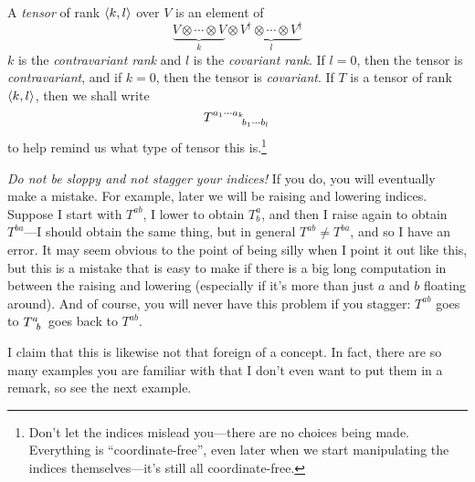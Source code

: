 \begin{dfn}[Tensor]\label{Tensor}
A \emph{tensor} of rank $\langle k,l\rangle$ over $V$ is an element of
\begin{equation}
\underbrace{V\otimes \cdots \otimes V}_k\otimes \underbrace{V^{\dagger}\otimes \cdots \otimes V^{\dagger}}_l
\end{equation}
$k$ is the \emph{contravariant rank} and $l$ is the \emph{covariant rank}.  If $l=0$, then the tensor is \emph{contravariant}, and if $k=0$, then the tensor is \emph{covariant}.  If $T$ is a tensor of rank $\langle k,l\rangle$, then we shall write
\begin{equation}
T\indices{^{a_1\cdots a_k}_{b_1\cdots b_l}}
\end{equation}
to help remind us what type of tensor this is.\footnote{Don't let the indices mislead you---there are no choices being made.  Everything is ``coordinate-free'', even later when we start manipulating the indices themselves---it's still all coordinate-free.}
\begin{rmk}
\emph{Do not be sloppy and not stagger your indices!}  If you do, you will eventually make a mistake.  For example, later we will be raising and lowering indices.  Suppose I start with $T^{ab}$, I lower to obtain $T_b^a$, and then I raise again to obtain $T^{ba}$---I should obtain the same thing, but in general $T^{ab}\neq T^{ba}$, and so I have an error.  It may seem obvious to the point of being silly when I point it out like this, but this is a mistake that is easy to make if there is a big long computation in between the raising and lowering (especially if it's more than just $a$ and $b$ floating around).  And of course, you will never have this problem if you stagger:  $T^{ab}$ goes to $T\indices{^a_b}$ goes back to $T^{ab}$.
\end{rmk}
\begin{rmk}
I claim that this is likewise not that foreign of a concept.  In fact, there are so many examples you are familiar with that I don't even want to put them in a remark, so see the next example.
\end{rmk}
\end{dfn}
